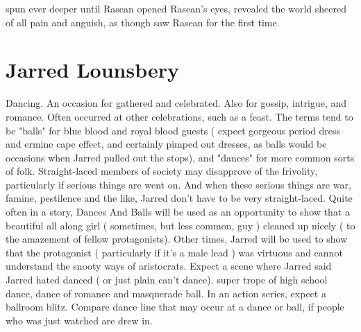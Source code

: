 \documentclass[12pt]{book}
\begin{document}
spun ever deeper until Rasean opened Rasean's eyes, revealed the world sheered of all pain and anguish, as though saw Rasean for the first time.



\chapter{Jarred Lounsbery}

Dancing. An occasion for gathered and celebrated. Also for gossip, intrigue, and romance. Often occurred at other celebrations, such as a feast. The terms tend to be "balls" for blue blood and royal blood guests ( expect gorgeous period dress and ermine cape effect, and certainly pimped out dresses, as balls would be occasions when Jarred pulled out the stops), and "dances" for more common sorts of folk. Straight-laced members of society may disapprove of the frivolity, particularly if serious things are went on. And when these serious things are war, famine, pestilence and the like, Jarred don't have to be very straight-laced. Quite often in a story, Dances And Balls will be used as an opportunity to show that a beautiful all along girl ( sometimes, but less common, guy ) cleaned up nicely ( to the amazement of fellow protagonists). Other times, Jarred will be used to show that the protagonist ( particularly if it's a male lead ) was virtuous and cannot understand the snooty ways of aristocrats. Expect a scene where Jarred said Jarred hated danced ( or just plain can't dance). super trope of high school dance, dance of romance and masquerade ball. In an action series, expect a ballroom blitz. Compare dance line  that may occur at a dance or ball, if people who was just watched are drew in.
\end{document}
